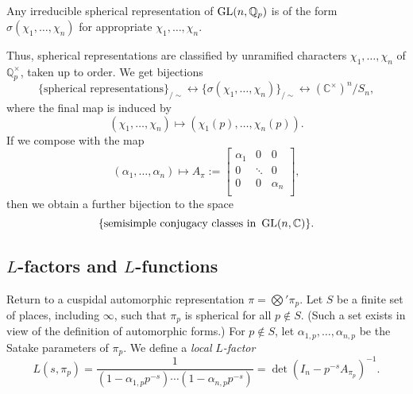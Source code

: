 \documentclass[reqno]{amsart} 
\begin{document}
\begin{theorem}
  Any irreducible spherical representation of $\operatorname{GL}(n, \mathbb{Q}_p)$ is of the form $\sigma(\chi_1, \dotsc, \chi_n)$ for appropriate $\chi_1, \dotsc, \chi_n$.
\end{theorem}

Thus, spherical representations are classified by unramified characters $\chi_1, \dotsc, \chi_n$ of $\mathbb{Q}_p^\times$, taken up to order.  We get bijections
\begin{equation*}
  \{\text{spherical representations}\}_{/\sim}
  \longleftrightarrow
  \{\sigma(\chi_1, \dotsc, \chi_n)\} _{/\sim}
  \longleftrightarrow
  (\mathbb{C}^\times)^n / S_n,
\end{equation*}
where the final map is induced by
\begin{equation*}
  (\chi_1, \dotsc, \chi_n)
  \mapsto (\chi_1(p), \dotsc, \chi_n(p)).
\end{equation*}
If we compose with the map
\begin{equation*}
  (\alpha_1, \dotsc, \alpha_n)
  \mapsto
  A_\pi :=
  \begin{bmatrix}
    \alpha_1    & 0 & 0 \\
    0 & \ddots & 0 \\
    0 & 0 & \alpha_n \\
  \end{bmatrix},
\end{equation*}
then we obtain a further bijection to the space
\begin{equation*}
  \{\text{semisimple conjugacy classes in } \operatorname{GL}(n, \mathbb{C})\}.
\end{equation*}

\subsection{$L$-factors and $L$-functions}

Return to a cuspidal automorphic representation $\pi = \bigotimes' \pi_p$.  Let $S$ be a finite set of places, including $\infty$, such that $\pi_p$ is spherical for all $p \notin S$.  (Such a set exists in view of the definition of automorphic forms.)  For $p \notin S$, let $\alpha_{1, p}, \dotsc, \alpha_{n, p}$ be the Satake parameters of $\pi_p$.  We define a \emph{local} $L$\emph{-factor}
\begin{equation*}
  L(s, \pi_p)
  = \frac{1}{(1 - \alpha_{1, p} p^{- s}) \dotsb (1 - \alpha_{n, p} p^{- s})}
  =
  \det \left( I_n - p^{- s} A_{\pi_p} \right)^{-1}.
\end{equation*}
\end{document}
